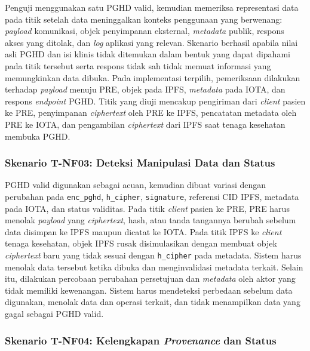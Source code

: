 Penguji menggunakan satu PGHD valid, kemudian memeriksa representasi data pada titik setelah data meninggalkan konteks penggunaan yang berwenang: \textit{payload} komunikasi, objek penyimpanan eksternal, \textit{metadata} publik, respons akses yang ditolak, dan \textit{log} aplikasi yang relevan.
Skenario berhasil apabila nilai asli PGHD dan isi klinis tidak ditemukan dalam bentuk yang dapat dipahami pada titik tersebut serta respons tidak sah tidak memuat informasi yang memungkinkan data dibuka.
Pada implementasi terpilih, pemeriksaan dilakukan terhadap \textit{payload} menuju PRE, objek pada IPFS, \textit{metadata} pada IOTA, dan respons \textit{endpoint} PGHD\@.
Titik yang diuji mencakup pengiriman dari \textit{client} pasien ke PRE, penyimpanan \textit{ciphertext} oleh PRE ke IPFS, pencatatan metadata oleh PRE ke IOTA, dan pengambilan \textit{ciphertext} dari IPFS saat tenaga kesehatan membuka PGHD\@.

\subsubsection{Skenario T-NF03: Deteksi Manipulasi Data dan Status}

PGHD valid digunakan sebagai acuan, kemudian dibuat variasi dengan perubahan pada \texttt{enc\_pghd}, \texttt{h\_cipher}, \texttt{signature}, referensi CID IPFS, metadata pada IOTA, dan status validitas.
Pada titik \textit{client} pasien ke PRE, PRE harus menolak \textit{payload} yang \textit{ciphertext}, hash, atau tanda tangannya berubah sebelum data disimpan ke IPFS maupun dicatat ke IOTA\@.
Pada titik IPFS ke \textit{client} tenaga kesehatan, objek IPFS rusak disimulasikan dengan membuat objek \textit{ciphertext} baru yang tidak sesuai dengan \texttt{h\_cipher} pada metadata.
Sistem harus menolak data tersebut ketika dibuka dan menginvalidasi metadata terkait.
Selain itu, dilakukan percobaan perubahan persetujuan dan \textit{metadata} oleh aktor yang tidak memiliki kewenangan.
Sistem harus mendeteksi perbedaan sebelum data digunakan, menolak data dan operasi terkait, dan tidak menampilkan data yang gagal sebagai PGHD valid.


\subsubsection{Skenario T-NF04: Kelengkapan \textit{Provenance} dan Status}

